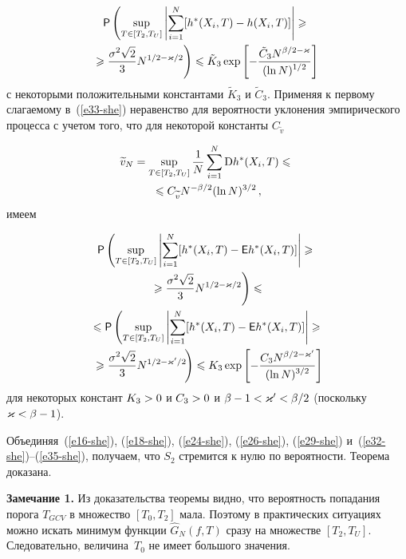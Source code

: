 \begin{multicols}{2}
\noindent
\begin{multline}
{\sf P}\left(\sup\limits_{T\in[T_2,T_U]}\abs{\sum\limits_{i=1}^N[h^*(X_i,T)-h(X_i,T)]}\geqslant {}\right.\\
\hspace*{-2mm}\left.{}\geqslant
\fr{\sigma^2\sqrt{2}}{3}N^{1/2-\varkappa/2}\right)\leqslant\tilde{K}_3\exp
\left[-\fr{\tilde{C}_3 N^{\beta/2-\varkappa}}{(\ln N)^{1/2}}\right]\!\label{e34-she}
\end{multline}
с некоторыми положительными константами $\tilde{K}_3$ и $\tilde{C}_3$.
Применяя к первому слагаемому в~(\ref{e33-she}) неравенство для вероятности уклонения эмпирического процесса с 
учетом того, что для некоторой константы $C_{\widetilde{v}}$

\noindent
\begin{multline*}
\widetilde{v}_N=\sup\limits_{T\in[T_2,T_U]}\displaystyle\frac{\displaystyle 1\mathstrut}{\displaystyle N\mathstrut}\sum\limits_{i=1}^N\mathrm{D}h^*(X_i,T)\leqslant {}\\
{}\leqslant
C_{\widetilde{v}} N^{-\beta/2}(\ln N)^{3/2}\,,
\end{multline*}
имеем

\noindent
\begin{multline}
{\sf P}\left(\sup\limits_{T\in[T_2,T_U]}\abs{\sum\limits_{i=1}^N[h^*(X_i,T)-
{\sf E}h^*(X_i,T)]}\geqslant{}\right.\\
\left.{}\geqslant \fr{\sigma^2\sqrt{2}}{3}N^{1/2-\varkappa/2}\right)\leqslant{}\\
{}\leqslant{\sf P}\left(\sup\limits_{T\in[T_2,T_U]}\abs{\sum\limits_{i=1}^N[h^*(X_i,T)-{\sf E}h^*(X_i,T)]}
\geqslant{}\right.\\
\hspace*{-2mm}\left.{}\geqslant \fr{\sigma^2\sqrt{2}}{3}N^{1/2-\varkappa'/2}\!\right)\leqslant
K_3\exp\left[-\fr{C_3 N^{\beta/2-\varkappa'}}{(\ln N)^{3/2}}\right]\!\!\!\label{e35-she}
\end{multline}
для некоторых констант $K_3\hm>0$ и $C_3\hm>0$ и $\beta\hm-1\hm<\varkappa'\hm<\beta/2$ (поскольку $\varkappa\hm<\beta\hm-1$).

\pagebreak

Объединяя~(\ref{e16-she}), (\ref{e18-she}), (\ref{e24-she}), 
(\ref{e26-she}), (\ref{e29-she}) и~(\ref{e32-she})--(\ref{e35-she}), получаем, что 
$S_2$ стремится к нулю по вероятности.
Теорема доказана.

\medskip
\noindent
\textbf{Замечание 1.} Из доказательства теоремы видно, что вероятность попадания порога $T_{GCV}$ в 
множество $[T_0,T_2]$ мала. Поэтому в практических ситуациях можно искать минимум функции $\widehat{G}_N(f,T)$ сразу на множестве 
$[T_2,T_U]$. Следовательно, величина~$T_0$ не имеет большого значения.


\end{multicols}

